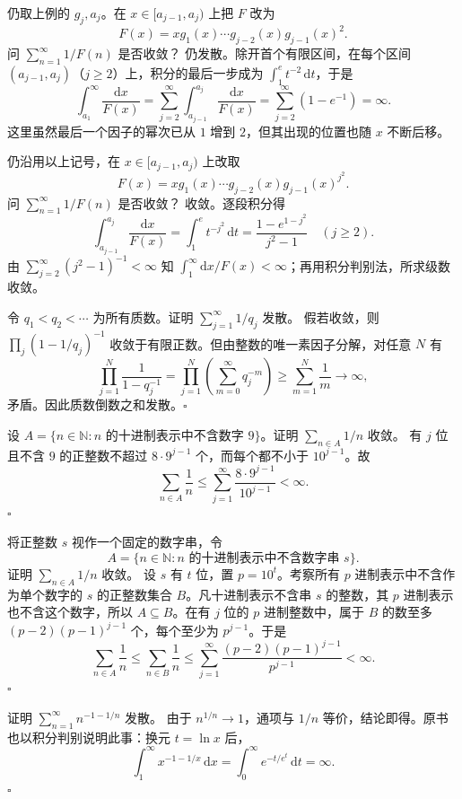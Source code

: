 仍取上例的 $g_j,a_j$。在 $x\in[a_{j-1},a_j)$ 上把 $F$ 改为
\[
F(x)=xg_1(x)\cdots g_{j-2}(x)g_{j-1}(x)^2.
\]
问 $\sum_{n=1}^{\infty}1/F(n)$ 是否收敛？
\sol 仍发散。除开首个有限区间，在每个区间 $(a_{j-1},a_j)$（$j\ge2$）上，积分的最后一步成为 $\int_1^e t^{-2}\,\mathrm dt$，于是
\[
\int_{a_1}^{\infty}\frac{\mathrm dx}{F(x)}
=\sum_{j=2}^{\infty}\int_{a_{j-1}}^{a_j}\frac{\mathrm dx}{F(x)}
=\sum_{j=2}^{\infty}(1-e^{-1})=\infty.
\]
这里虽然最后一个因子的幂次已从 $1$ 增到 $2$，但其出现的位置也随 $x$ 不断后移。

仍沿用以上记号，在 $x\in[a_{j-1},a_j)$ 上改取
\[
F(x)=xg_1(x)\cdots g_{j-2}(x)g_{j-1}(x)^{j^2}.
\]
问 $\sum_{n=1}^{\infty}1/F(n)$ 是否收敛？
\sol 收敛。逐段积分得
\[
\int_{a_{j-1}}^{a_j}\frac{\mathrm dx}{F(x)}
=\int_1^e t^{-j^2}\,\mathrm dt
=\frac{1-e^{1-j^2}}{j^2-1}\quad(j\ge2).
\]
由 $\sum_{j=2}^{\infty}(j^2-1)^{-1}<\infty$ 知 $\int_1^{\infty}\!\mathrm dx/F(x)<\infty$；再用积分判别法，所求级数收敛。

令 $q_1<q_2<\cdots$ 为所有质数。证明 $\sum_{j=1}^{\infty}1/q_j$ 发散。
\pf 假若收敛，则 $\prod_j(1-1/q_j)^{-1}$ 收敛于有限正数。但由整数的唯一素因子分解，对任意 $N$ 有
\[
\prod_{j=1}^{N}\frac1{1-q_j^{-1}}
=\prod_{j=1}^{N}\left(\sum_{m=0}^{\infty}q_j^{-m}\right)
\geq\sum_{m=1}^{N}\frac1m\longrightarrow\infty,
\]
矛盾。因此质数倒数之和发散。\hfill$\square$

设 $A=\{n\in\mathbb N:n\text{ 的十进制表示中不含数字 }9\}$。证明 $\sum_{n\in A}1/n$ 收敛。
\pf 有 $j$ 位且不含 $9$ 的正整数不超过 $8\cdot9^{j-1}$ 个，而每个都不小于 $10^{j-1}$。故
\[
\sum_{n\in A}\frac1n
\leq\sum_{j=1}^{\infty}\frac{8\cdot9^{j-1}}{10^{j-1}}<\infty.
\]
\hfill$\square$

将正整数 $s$ 视作一个固定的数字串，令
\[
A=\{n\in\mathbb N:n\text{ 的十进制表示中不含数字串 }s\}.
\]
证明 $\sum_{n\in A}1/n$ 收敛。
\pf 设 $s$ 有 $t$ 位，置 $p=10^t$。考察所有 $p$ 进制表示中不含作为单个数字的 $s$ 的正整数集合 $B$。凡十进制表示不含串 $s$ 的整数，其 $p$ 进制表示也不含这个数字，所以 $A\subseteq B$。在有 $j$ 位的 $p$ 进制整数中，属于 $B$ 的数至多 $(p-2)(p-1)^{j-1}$ 个，每个至少为 $p^{j-1}$。于是
\[
\sum_{n\in A}\frac1n\leq\sum_{n\in B}\frac1n
\leq\sum_{j=1}^{\infty}\frac{(p-2)(p-1)^{j-1}}{p^{j-1}}<\infty.
\]
\hfill$\square$

证明 $\sum_{n=1}^{\infty}n^{-1-1/n}$ 发散。
\pf 由于 $n^{1/n}\to1$，通项与 $1/n$ 等价，结论即得。原书也以积分判别说明此事：换元 $t=\ln x$ 后，
\[
\int_1^{\infty}x^{-1-1/x}\,\mathrm dx
=\int_0^{\infty}e^{-t/e^t}\,\mathrm dt=\infty.
\]
\hfill$\square$

